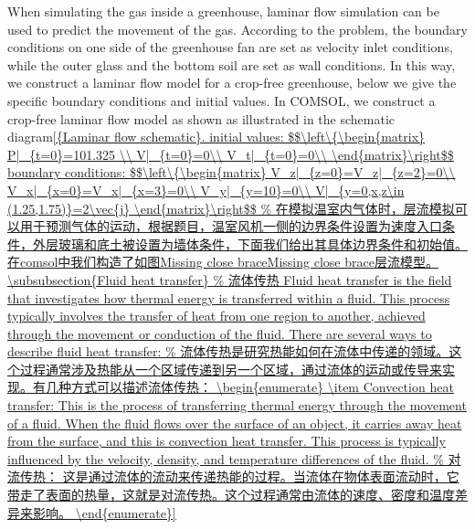 \documentclass{apmcmthesis}
\begin{document}
When simulating the gas inside a greenhouse, laminar flow simulation can be used to predict the movement of the gas. According to the problem, the boundary conditions on one side of the greenhouse fan are set as velocity inlet conditions, while the outer glass and the bottom soil are set as wall conditions. In this way, we construct a laminar flow model for a crop-free greenhouse, below we give the specific boundary conditions and initial values. In COMSOL, we construct a crop-free laminar flow model as shown as illustrated in the schematic diagram\ref{{Laminar flow schematic}.  
initial values:
$$\left\{\begin{matrix} 
  P|_{t=0}=101.325 \\ 
  V|_{t=0}=0\\
  V_t|_{t=0}=0\\
\end{matrix}\right$$
boundary conditions:
$$\left\{\begin{matrix} 
  V_z|_{z=0}=V_z|_{z=2}=0\\
V_x|_{x=0}=V_x|_{x=3}=0\\
V_y|_{y=10}=0\\
V|_{y=0,x,z\in (1.25,1.75)}=2\vec{j} 
\end{matrix}\right$$

\subsubsection{Fluid heat transfer}

Fluid heat transfer is the field that investigates how thermal energy is transferred within a fluid. This process typically involves the transfer of heat from one region to another, achieved through the movement or conduction of the fluid. There are several ways to describe fluid heat transfer:
\begin{enumerate}
	\item Convection heat transfer: This is the process of transferring thermal energy through the movement of a fluid. When the fluid flows over the surface of an object, it carries away heat from the surface, and this is convection heat transfer. This process is typically influenced by the velocity, density, and temperature differences of the fluid.


\end{enumerate}}
\end{document}
